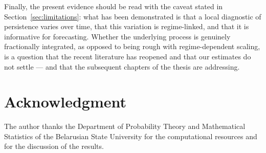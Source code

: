 \documentclass[journal]{IEEEtran}
\begin{document}
Finally, the present evidence should be read with the caveat stated in
Section~\ref{sec:limitations}: what has been demonstrated is that a local diagnostic of
persistence varies over time, that this variation is regime-linked, and that it is informative for
forecasting. Whether the underlying process is genuinely fractionally integrated, as opposed to
being rough with regime-dependent scaling, is a question that the recent literature has reopened
and that our estimates do not settle --- and that the subsequent chapters of the thesis are
addressing.

\section*{Acknowledgment}

The author thanks the Department of Probability Theory and Mathematical Statistics of the
Belarusian State University for the computational resources and for the discussion of the
results.
\end{document}

